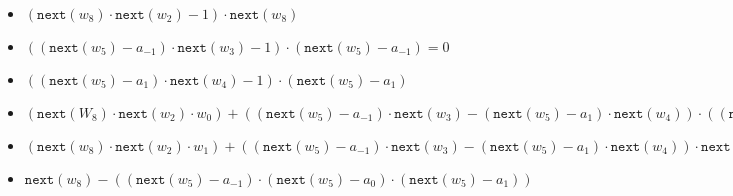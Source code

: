 \begin{itemize}
    \item $(\texttt{next}(w_8) \cdot \texttt{next}(w_2) - 1) \cdot \texttt{next}(w_8)$
    \item $((\texttt{next}(w_5) - a_{-1}) \cdot \texttt{next}(w_3) - 1) \cdot (\texttt{next}(w_5) - a_{-1}) = 0$
    \item $((\texttt{next}(w_5) - a_1) \cdot \texttt{next}(w_4) - 1) \cdot (\texttt{next}(w_5) - a_1)$
	\item $(\texttt{next}(W_8) \cdot \texttt{next}(w_2) \cdot w_0) + ((\texttt{next}(w_5) - a_{-1}) \cdot \texttt{next}(w_3) - (\texttt{next}(w_5) - a_1) \cdot \texttt{next}(w_4)) \cdot ((\texttt{next}(w_5) - a_{-1}) \cdot \texttt{next}(w_3) - (\texttt{next}(w_5) - a_1) \cdot \texttt{next}(w_4)) \cdot \texttt{next}(w_6) - \texttt{next}(w_0) = 0$
    \item $(\texttt{next}(w_8)\cdot \texttt{next}(w_2) \cdot w_1) +((\texttt{next}(w_5) - a_{-1}) \cdot \texttt{next}(w_3) - (\texttt{next}(w_5) - a_1) \cdot \texttt{next}(w_4)) \cdot \texttt{next}(w_7) - \texttt{next}(w_1) = 0$
    \item $\texttt{next}(w_8) - ((\texttt{next}(w_5) - a_{-1}) \cdot (\texttt{next}(w_5) - a_0) \cdot (\texttt{next}(w_5) - a_1))$
\end{itemize}

